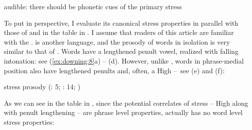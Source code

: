 \documentclass[output=paper
,newtxmath
,modfonts
,nonflat]{langsci/langscibook}
\begin{document}
\ex\label{ex:downing:7i} audible: there should be phonetic cues of the primary stress
\z
\z

To put  in perspective, I evaluate its canonical stress properties in parallel with those of  and  in the table in . I assume that readers of this article are familiar with the  .  is another  language, and the prosody of words in isolation is very similar to that of . Words have a lengthened penult vowel, realized with falling intonation: see (\ref{ex:downing:8}a) – (d). However, unlike , words in phrase-medial position also have lengthened penults and, often, a High  –~see (e) and (f):

\begin{comment}
\ea%
    \label{bkm:Ref336865042}
    \langinfo{lg}{fam}{src}\\
    \gll \\  
        \\
    \glt
    \z
\end{comment}

\ea\label{ex:downing:8}  stress prosody (\citealt{Ashton1947}: 5; \citealt{Mohamed2001}: 14; \citealt{Polomé1967})
\ea\label{ex:downing:8a}
\ex\label{ex:downing:8b}
\ex\label{ex:downing:8c}
\ex\label{ex:downing:8d}
\ex\label{ex:downing:8e}
\ex\label{ex:downing:8f}
\z
\z

As we can see in the table in , since the potential correlates of stress – High  along with penult lengthening – are phrase level properties,  actually has no word level stress properties:
 
\end{document}
